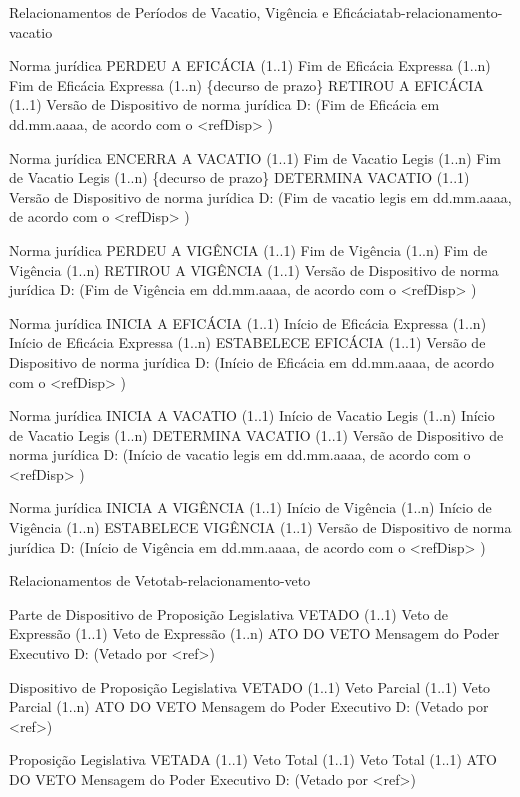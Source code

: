 \begin{tabelarelacionamento}{Relacionamentos
de Períodos de Vacatio, Vigência e Eficácia}{tab-relacionamento-vacatio}

  \relacionamento
  	{Norma jurídica}
 	{PERDEU A EFICÁCIA (1..1)}
 	{Fim de Eficácia Expressa}
 	{(1..n) Fim de Eficácia Expressa (1..n)
 	 \mypar
 	 \{decurso de prazo\}}
 	{RETIROU A EFICÁCIA (1..1)}
 	{Versão de Dispositivo de norma jurídica}
 	{D: (Fim de Eficácia em dd.mm.aaaa, de acordo com o <refDisp> )}

  \relacionamento
  	{Norma jurídica}
 	{ENCERRA A VACATIO (1..1)}
 	{Fim de Vacatio Legis}
 	{(1..n) Fim de Vacatio Legis (1..n)
 	 \mypar
 	 \{decurso de prazo\}}
 	{DETERMINA VACATIO (1..1)}
 	{Versão de Dispositivo de norma jurídica}
 	{D: (Fim de vacatio legis em dd.mm.aaaa, de acordo com o <refDisp> )}


  \relacionamento
  	{Norma jurídica}
 	{PERDEU A VIGÊNCIA (1..1)}
 	{Fim de Vigência}
 	{(1..n) Fim de Vigência (1..n)}
 	{RETIROU A VIGÊNCIA (1..1)}
 	{Versão de Dispositivo de norma jurídica}
 	{D: (Fim de Vigência em dd.mm.aaaa, de acordo com o <refDisp> )}

  \relacionamento
  	{Norma jurídica}
 	{INICIA A EFICÁCIA (1..1)}
 	{Início de Eficácia Expressa}
 	{(1..n) Início de Eficácia Expressa (1..n)}
 	{ESTABELECE EFICÁCIA (1..1)}
 	{Versão de Dispositivo de norma jurídica}
 	{D: (Início de Eficácia em dd.mm.aaaa, de acordo com o <refDisp> )}

  \relacionamento
  	{Norma jurídica}
 	{INICIA A VACATIO (1..1)}	
 	{Início de Vacatio Legis}
 	{(1..n) Início de Vacatio Legis (1..n)}
 	{DETERMINA VACATIO (1..1)}
 	{Versão de Dispositivo de norma jurídica}
 	{D: (Início de vacatio legis em dd.mm.aaaa, de acordo com o <refDisp> )}

  \relacionamento
  	{Norma jurídica}
 	{INICIA A VIGÊNCIA (1..1)}
 	{Início de Vigência}
 	{(1..n) Início de Vigência (1..n)}
 	{ESTABELECE VIGÊNCIA (1..1)}
 	{Versão de Dispositivo de norma jurídica}
 	{D: (Início de Vigência em dd.mm.aaaa, de acordo com o <refDisp> )}
\end{tabelarelacionamento}


\begin{tabelarelacionamento}{Relacionamentos
de Veto}{tab-relacionamento-veto}

  \relacionamento
  	{Parte de Dispositivo de Proposição Legislativa}
 	{VETADO (1..1)}
 	{Veto de Expressão}
 	{(1..1) Veto de Expressão (1..n)}
 	{ATO DO VETO}
 	{Mensagem do Poder Executivo}
 	{D: (Vetado por <ref>)}

  \relacionamento
  	{Dispositivo de Proposição Legislativa}
 	{VETADO (1..1)}
 	{Veto Parcial}
 	{(1..1) Veto Parcial (1..n)}
 	{ATO DO VETO}
 	{Mensagem do Poder Executivo}
 	{D: (Vetado por <ref>)}
 	
  \relacionamento
  	{Proposição Legislativa}
 	{VETADA (1..1)}
 	{Veto Total}
 	{(1..1) Veto Total (1..1)}
 	{ATO DO VETO}
 	{Mensagem do Poder Executivo}
 	{D: (Vetado por <ref>)}
 	
\end{tabelarelacionamento} 	


